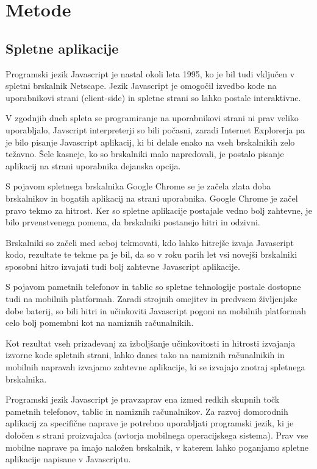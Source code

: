 \chapter{Metode}

\section{Spletne aplikacije}

Programski jezik Javascript je nastal okoli leta 1995, ko je bil tudi vključen v spletni brskalnik Netscape. Jezik Javascript je omogočil izvedbo kode na uporabnikovi strani (client-side) in spletne strani so lahko postale interaktivne.

V zgodnjih dneh spleta se programiranje na uporabnikovi strani ni prav veliko uporabljalo, Javscript interpreterji so bili počasni, zaradi Internet Explorerja pa je bilo pisanje Javascript aplikacij, ki bi delale enako na vseh brskalnikih zelo težavno. Šele kasneje, ko so brskalniki malo napredovali, je postalo pisanje aplikacij na strani uporabnika dejanska opcija.

S pojavom spletnega brskalnika Google Chrome se je začela zlata doba brskalnikov in bogatih aplikacij na strani uporabnika. Google Chrome je začel pravo tekmo za hitrost. Ker so spletne aplikacije postajale vedno bolj zahtevne, je bilo prvenstvenega pomena, da brskalniki postanejo hitri in odzivni.

Brskalniki so začeli med seboj tekmovati, kdo lahko hitrejše izvaja Javascript kodo, rezultate te tekme pa je bil, da so v roku parih let vsi novejši brskalniki sposobni hitro izvajati tudi bolj zahtevne Javascript aplikacije. 

S pojavom pametnih telefonov in tablic so spletne tehnologije postale dostopne tudi na mobilnih platformah. Zaradi strojnih omejitev in predvsem življenjske dobe baterij, so bili hitri in učinkoviti Javascript pogoni na mobilnih platformah celo bolj pomembni kot na namiznih računalnikih.

Kot rezultat vseh prizadevanj za izboljšanje učinkovitosti in hitrosti izvajanja izvorne kode spletnih strani, lahko danes tako na namiznih računalnikih in mobilnih napravah izvajamo zahtevne aplikacije, ki se izvajajo znotraj spletnega brskalnika.

Programski jezik Javascript je pravzaprav ena izmed redkih skupnih točk pametnih telefonov, tablic in namiznih računalnikov. Za razvoj domorodnih aplikacij za specifične naprave je potrebno uporabljati programski jezik, ki je določen s strani proizvajalca (avtorja mobilnega operacijskega sistema). Prav vse mobilne naprave pa imajo naložen brskalnik, v katerem lahko poganjamo spletne aplikacije napisane v Javascriptu.

